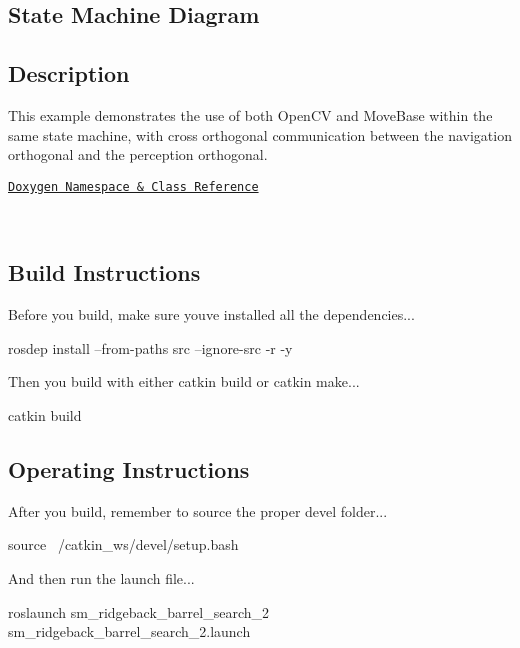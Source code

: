 \subsection*{State Machine Diagram}



\subsection*{Description}

This example demonstrates the use of both Open\+CV and Move\+Base within the same state machine, with cross orthogonal communication between the navigation orthogonal and the perception orthogonal.~\newline


\href{https://reelrbtx.github.io/SMACC_Documentation/master/html/namespacesm__moveit.html}{\tt Doxygen Namespace \& Class Reference}

 

~\newline


\subsection*{Build Instructions}

Before you build, make sure you\textquotesingle{}ve installed all the dependencies...


\begin{DoxyCode}
rosdep install --from-paths src --ignore-src -r -y 
\end{DoxyCode}


Then you build with either catkin build or catkin make...


\begin{DoxyCode}
catkin build
\end{DoxyCode}


\subsection*{Operating Instructions}

After you build, remember to source the proper devel folder...


\begin{DoxyCode}
source ~/catkin\_ws/devel/setup.bash
\end{DoxyCode}


And then run the launch file...


\begin{DoxyCode}
roslaunch sm\_ridgeback\_barrel\_search\_2 sm\_ridgeback\_barrel\_search\_2.launch
\end{DoxyCode}


